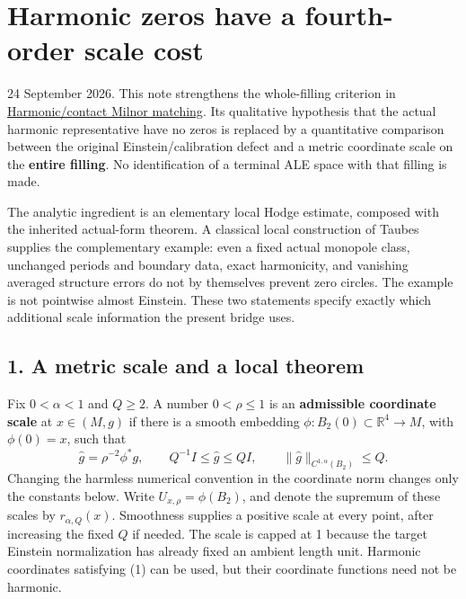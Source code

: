 \documentclass[
  11pt,
]{article}
\author{}
\date{}
\begin{document}
\hypertarget{harmonic-zeros-have-a-fourth-order-scale-cost}{%
\section{Harmonic zeros have a fourth-order scale
cost}\label{harmonic-zeros-have-a-fourth-order-scale-cost}}

24 September 2026. This note strengthens the whole-filling criterion in
\href{20260924_harmonic_contact_milnor_matching.md}{Harmonic/contact
Milnor matching}. Its qualitative hypothesis that the actual harmonic
representative have no zeros is replaced by a quantitative comparison
between the original Einstein/calibration defect and a metric coordinate
scale on the \textbf{entire filling}. No identification of a terminal
ALE space with that filling is made.

The analytic ingredient is an elementary local Hodge estimate, composed
with the inherited actual-form theorem. A classical local construction
of Taubes supplies the complementary example: even a fixed actual
monopole class, unchanged periods and boundary data, exact harmonicity,
and vanishing averaged structure errors do not by themselves prevent
zero circles. The example is not pointwise almost Einstein. These two
statements specify exactly which additional scale information the
present bridge uses.

\hypertarget{a-metric-scale-and-a-local-theorem}{%
\subsection{1. A metric scale and a local
theorem}\label{a-metric-scale-and-a-local-theorem}}

Fix \(0<\alpha<1\) and \(Q\ge 2\). A number \(0<\rho\le1\) is an
\textbf{admissible coordinate scale} at \(x\in(M,g)\) if there is a
smooth embedding \(\phi:B_2(0)\subset\mathbb R^4\longrightarrow M\),
with \(\phi(0)=x\), such that \[
 \widehat g=\rho^{-2}\phi^*g,\qquad
 Q^{-1}I\le\widehat g\le QI,\qquad
 \|\widehat g\|_{C^{1,\alpha}(B_2)}\le Q.                \tag{1}
\] Changing the harmless numerical convention in the coordinate norm
changes only the constants below. Write \(U_{x,\rho}=\phi(B_2)\), and
denote the supremum of these scales by \(r_{\alpha,Q}(x)\). Smoothness
supplies a positive scale at every point, after increasing the fixed
\(Q\) if needed. The scale is capped at 1 because the target Einstein
normalization has already fixed an ambient length unit. Harmonic
coordinates satisfying (1) can be used, but their coordinate functions
need not be harmonic.
\end{document}
